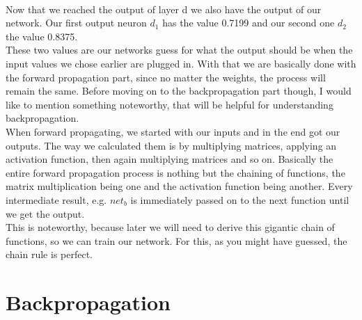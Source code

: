 \documentclass[11pt, halfparskip]{article}
\begin{document}
        \noindent \\
        Now that we reached the output of layer d we also have the output of our network. Our first output neuron $d_1$ has the value 0.7199 and our second one $d_2$ the 
        value 0.8375.\\
        These two values are our networks guess for what the output should be when the input values we chose earlier are plugged in. With that we are basically done with the forward
        propagation part, since no matter the weights, the process will remain the same. Before moving on to the backpropagation part though, I would like to mention something
        noteworthy, that will be helpful for understanding backpropagation.\\
        When forward propagating, we started with our inputs and in the end got our outputs. The way we calculated them is by multiplying matrices, applying an activation function, then
        again multiplying matrices and so on. Basically the entire forward propagation process is nothing but the chaining of functions, the matrix multiplication being one and the
        activation function being another. Every intermediate result, e.g. $net_b$ is immediately passed on to the next function until we get the output.\\
        This is noteworthy, because later we will need to derive this gigantic chain of functions, so we can train our network. For this, as you might have guessed, the chain rule is perfect.
        
     \newpage
     \section{Backpropagation}
     \label{sec:backpropagation}
\end{document}
